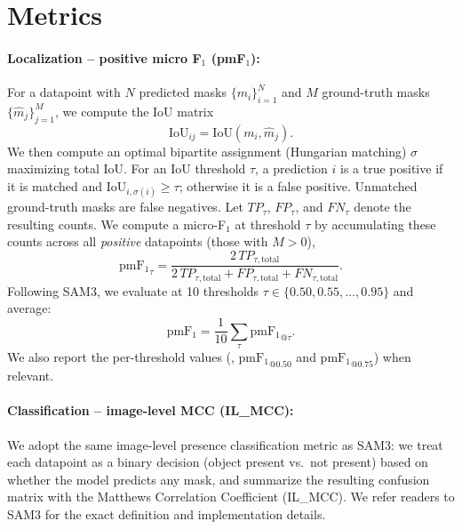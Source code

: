
\appendix

\setcounter{table}{0}
\setcounter{figure}{0}
\renewcommand{\thetable}{A.\arabic{table}}
\renewcommand{\thefigure}{A.\arabic{figure}}



\section{Metrics\label{appendix:metrics}}
\paragraph{Localization -- positive micro F$_1$ (pmF$_1$):}
For a datapoint with $N$ predicted masks $\{m_i\}_{i=1}^N$ and $M$ ground-truth masks $\{\hat m_j\}_{j=1}^M$, we compute the IoU matrix
\begin{equation}
\mathrm{IoU}_{ij} = \mathrm{IoU}(m_i, \hat m_j).
\end{equation}
We then compute an optimal bipartite assignment (Hungarian matching) $\sigma$ maximizing total IoU. For an IoU threshold $\tau$, a prediction $i$ is a true positive if it is matched and $\mathrm{IoU}_{i,\sigma(i)} \ge \tau$; otherwise it is a false positive. Unmatched ground-truth masks are false negatives. Let $TP_\tau$, $FP_\tau$, and $FN_\tau$ denote the resulting counts. We compute a micro-F$_1$ at threshold $\tau$ by accumulating these counts across all \emph{positive} datapoints (those with $M>0$),
\begin{equation}
\mathrm{pmF_1}_\tau =
\frac{2\,TP_{\tau,\mathrm{total}}}{2\,TP_{\tau,\mathrm{total}} + FP_{\tau,\mathrm{total}} + FN_{\tau,\mathrm{total}}}.
\end{equation}
Following SAM3, we evaluate at 10 thresholds $\tau \in \{0.50, 0.55, \dots, 0.95\}$ and average:
\begin{equation}
\mathrm{pmF_1} = \frac{1}{10}\sum_{\tau}\mathrm{pmF_1}_{@\tau}.
\end{equation}
We also report the per-threshold values (\eg, $\mathrm{pmF_1}_{@0.50}$ and $\mathrm{pmF_1}_{@0.75}$) when relevant.

\paragraph{Classification -- image-level MCC (IL\_MCC):} We adopt the same image-level presence classification metric as SAM3: we treat each datapoint as a binary decision (object present vs.\ not present) based on whether the model predicts any mask, and summarize the resulting confusion matrix with the Matthews Correlation Coefficient (IL\_MCC). We refer readers to SAM3 for the exact definition and implementation details.

